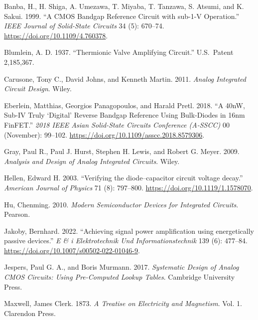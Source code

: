 \documentclass[
  a4paper,
  DIV=11,
  numbers=noendperiod]{scrartcl}
\newlength{\cslhangindent}
\newenvironment{CSLReferences}[2] %
 {\begin{list}{}{%
  \setlength{\itemindent}{0pt}
  \setlength{\leftmargin}{0pt}
  \setlength{\parsep}{0pt}
  \ifodd #1
   \setlength{\leftmargin}{\cslhangindent}
   \setlength{\itemindent}{-1\cslhangindent}
  \fi
  \setlength{\itemsep}{#2\baselineskip}}}
 {\end{list}}
\begin{document}
\label{refs}
\begin{CSLReferences}{1}{0}
Banba, H., H. Shiga, A. Umezawa, T. Miyaba, T. Tanzawa, S. Atsumi, and
K. Sakui. 1999. {``A {CMOS} Bandgap Reference Circuit with {sub-1-V}
Operation.''} \emph{IEEE Journal of Solid-State Circuits} 34 (5):
670--74. \url{https://doi.org/10.1109/4.760378}.

Blumlein, A. D. 1937. {``Thermionic Valve Amplifying Circuit.''}
U.S.~Patent 2,185,367.

Carusone, Tony C., David Johns, and Kenneth Martin. 2011. \emph{{Analog
Integrated Circuit Design}}. Wiley.

Eberlein, Matthias, Georgios Panagopoulos, and Harald Pretl. 2018. {``{A
40nW, Sub-IV Truly {`Digital'} Reverse Bandgap Reference Using
Bulk-Diodes in 16nm FinFET}.''} \emph{2018 IEEE Asian Solid-State
Circuits Conference (A-SSCC)} 00 (November): 99--102.
\url{https://doi.org/10.1109/asscc.2018.8579306}.

Gray, Paul R., Paul J. Hurst, Stephen H. Lewis, and Robert G. Meyer.
2009. \emph{{Analysis and Design of Analog Integrated Circuits}}. Wiley.

Hellen, Edward H. 2003. {``{Verifying the diode--capacitor circuit
voltage decay}.''} \emph{American Journal of Physics} 71 (8): 797--800.
\url{https://doi.org/10.1119/1.1578070}.

Hu, Chenming. 2010. \emph{Modern Semiconductor Devices for Integrated
Circuits}. Pearson.

Jakoby, Bernhard. 2022. {``{Achieving signal power amplification using
energetically passive devices}.''} \emph{E \& i Elektrotechnik Und
Informationstechnik} 139 (6): 477--84.
\url{https://doi.org/10.1007/s00502-022-01046-9}.

Jespers, Paul G. A., and Boris Murmann. 2017. \emph{Systematic Design of
Analog CMOS Circuits: Using Pre-Computed Lookup Tables}. Cambridge
University Press.

Maxwell, James Clerk. 1873. \emph{A Treatise on Electricity and
Magnetism}. Vol. 1. Clarendon Press.


\end{CSLReferences}
\end{document}
